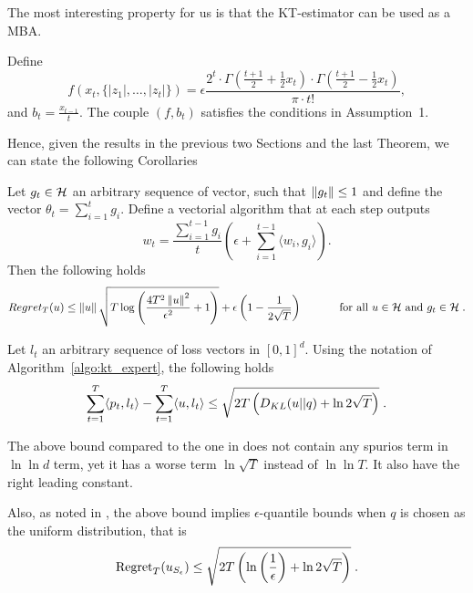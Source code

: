 The most interesting property for us is that the \ac{KT}-estimator can be used as a \ac{MBA}.
\begin{theorem}
\label{theo:kt_is_mba}
Define 
\begin{equation}
\label{eq:kt_potential}
f\left( x_{t}, \{|z_1|, \ldots, |z_{t}|\}\right) 
= \epsilon  \frac{2^t \cdot \Gamma \left(\frac{t+1}{2} + \frac{1}{2} x_{t} \right) \cdot \Gamma \left(\frac{t+1}{2} - \frac{1}{2} x_{t} \right)}{\pi \cdot t!}, 
\end{equation}
and $b_t= \frac{x_{t-1}}{t}$.
The couple $(f,b_t)$ satisfies the conditions in Assumption~1.
\end{theorem}

Hence, given the results in the previous two Sections and the last Theorem, we can state the following Corollaries
\begin{cor}
  \label{cor:kt_hilbert}
  Let $g_t \in \mathcal{H}$ an arbitrary sequence of vector, such that $\left\|{g_t}\right\| \leq 1$ and define the vector $\theta_t=\sum_{i=1}^{t} g_i$.
  Define a vectorial algorithm that at each step outputs 
  \[
  w_t = \frac{\sum_{i=1}^{t-1} g_i}{t} \left(\epsilon+ \sum_{i=1}^{t-1} \langle w_i, g_i \rangle \right).
  \]
  Then the following holds
  \[
    Regret_T(u) \leq \left\|{u}\right\| \sqrt{T \log \left(\frac{4 T^2 \left\|{u}\right\|^2}{\epsilon^2} +1 \right)} +\epsilon\left(1-\frac{1}{2\sqrt{T}}\right) \quad \quad \quad \textnormal{ for all } u \in \mathcal{H} \textnormal{ and } g_t \in \mathcal{H} \; .
  \]
\end{cor}

\begin{cor}
\label{cor:kt_expert}
Let $l_t$ an arbitrary sequence of loss vectors in $[0,1]^d$. Using the notation of Algorithm~\ref{algo:kt_expert}, the following holds
\[
\sum_{t=1}^T \langle p_t, l_t\rangle -\sum_{t=1}^T \langle u , l_t\rangle 
\leq \sqrt{2 T \left(D_{KL}(u||q) +\ln 2\sqrt{T}\right)} \; .
\]
\end{cor}

The above bound compared to the one in \citet{LuoS15} does not contain any spurios term in $\ln \ln d$ term, yet it has a worse term $\ln \sqrt{T}$ instead of $\ln \ln T$. It also have the right leading constant.

Also, as noted in \citet{LuoS15}, the above bound implies $\epsilon$-quantile bounds when $q$ is chosen as the uniform distribution, that is
\[
\operatorname{Regret}_T(u_{S_\epsilon}) \leq \sqrt{2 T \left(\ln\left(\frac{1}{\epsilon}\right) +\ln 2\sqrt{T}\right)} \; .
\]
